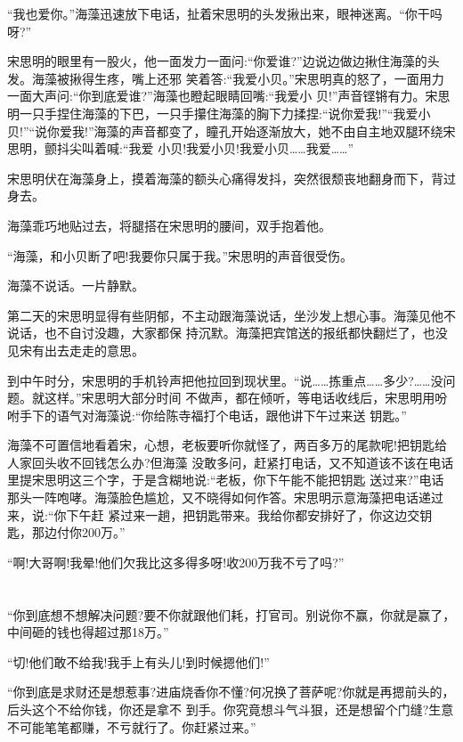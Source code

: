 \documentclass[11pt,a4paper,onecolumn]{article}
\begin{document}
``我也爱你。''海藻迅速放下电话，扯着宋思明的头发揪出来，眼神迷离。``你干吗呀?''

宋思明的眼里有一股火，他一面发力一面问:``你爱谁?''边说边做边揪住海藻的头发。海藻被揪得生疼，嘴上还邪
笑着答:``我爱小贝。''宋思明真的怒了，一面用力一面大声问:``你到底爱谁?''海藻也瞪起眼睛回嘴:``我爱小
贝!''声音铿锵有力。宋思明一只手捏住海藻的下巴，一只手攥住海藻的胸下力揉捏:``说你爱我!''``我爱小
贝!''``说你爱我!''海藻的声音都变了，瞳孔开始逐渐放大，她不由自主地双腿环绕宋思明，颤抖尖叫着喊:``我爱
小贝!我爱小贝!我爱小贝……我爱……''

宋思明伏在海藻身上，摸着海藻的额头心痛得发抖，突然很颓丧地翻身而下，背过身去。

海藻乖巧地贴过去，将腿搭在宋思明的腰间，双手抱着他。

``海藻，和小贝断了吧!我要你只属于我。''宋思明的声音很受伤。

海藻不说话。一片静默。

第二天的宋思明显得有些阴郁，不主动跟海藻说话，坐沙发上想心事。海藻见他不说话，也不自讨没趣，大家都保
持沉默。海藻把宾馆送的报纸都快翻烂了，也没见宋有出去走走的意思。

到中午时分，宋思明的手机铃声把他拉回到现状里。``说……拣重点……多少?……没问题。就这样。''宋思明大部分时间
不做声，都在倾听，等电话收线后，宋思明用吩咐手下的语气对海藻说:``你给陈寺福打个电话，跟他讲下午过来送
钥匙。''

海藻不可置信地看着宋，心想，老板要听你就怪了，两百多万的尾款呢!把钥匙给人家回头收不回钱怎么办?但海藻
没敢多问，赶紧打电话，又不知道该不该在电话里提宋思明这三个字，于是含糊地说:``老板，你下午能不能把钥匙
送过来?''电话那头一阵咆哮。海藻脸色尴尬，又不晓得如何作答。宋思明示意海藻把电话递过来，说:``你下午赶
紧过来一趟，把钥匙带来。我给你都安排好了，你这边交钥匙，那边付你200万。''

``啊!大哥啊!我晕!他们欠我比这多得多呀!收200万我不亏了吗?''

\section[\thesection]{}

``你到底想不想解决问题?要不你就跟他们耗，打官司。别说你不赢，你就是赢了，中间砸的钱也得超过那18万。''

``切!他们敢不给我!我手上有头儿!到时候摁他们!''

``你到底是求财还是想惹事?进庙烧香你不懂?何况换了菩萨呢?你就是再摁前头的，后头这个不给你钱，你还是拿不
到手。你究竟想斗气斗狠，还是想留个门缝?生意不可能笔笔都赚，不亏就行了。你赶紧过来。''
\end{document}
